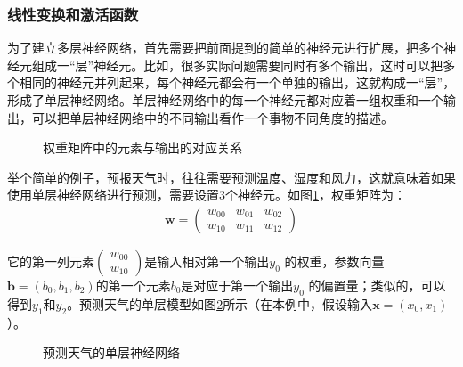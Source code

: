 
\subsubsection{线性变换和激活函数}

\parinterval 为了建立多层神经网络，首先需要把前面提到的简单的神经元进行扩展，把多个神经元组成一``层''神经元。比如，很多实际问题需要同时有多个输出，这时可以把多个相同的神经元并列起来，每个神经元都会有一个单独的输出，这就构成一``层''，形成了单层神经网络。单层神经网络中的每一个神经元都对应着一组权重和一个输出，可以把单层神经网络中的不同输出看作一个事物不同角度的描述。

\begin{figure}[htp]
\centering

\caption{权重矩阵中的元素与输出的对应关系}
\label{fig:5-10}
\end{figure}

\parinterval 举个简单的例子，预报天气时，往往需要预测温度、湿度和风力，这就意味着如果使用单层神经网络进行预测，需要设置3个神经元。如图\ref{fig:5-10}，权重矩阵为：
\begin{eqnarray}
\mathbf w=\begin{pmatrix} w_{00} & w_{01} & w_{02}\\ w_{10} & w_{11} & w_{12}\end{pmatrix}
\end{eqnarray}

\noindent 它的第一列元素$ \begin{pmatrix} w_{00}\\ w_{10}\end{pmatrix} $是输入相对第一个输出$ y_0 $ 的权重，参数向量$ \mathbf b=(b_0,b_1,b_2) $的第一个元素$ b_0 $是对应于第一个输出$ y_0 $ 的偏置量；类似的，可以得到$ y_1 $和$ y_2 $。预测天气的单层模型如图\ref{fig:5-11}所示（在本例中，假设输入$ \mathbf x=(x_0,x_1) $）。

\begin{figure}[htp]
\centering

\caption{预测天气的单层神经网络}
\label{fig:5-11}
\end{figure}


